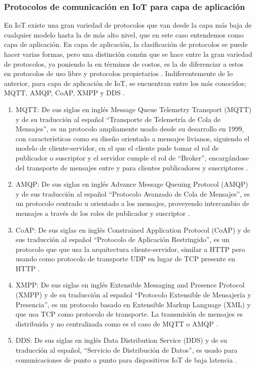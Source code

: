 \documentclass[stu,12pt,floatsintext]{apa7}
\begin{document}
	\subsubsection{Protocolos de comunicación en IoT para capa de aplicación}
	En IoT existe una gran variedad de protocolos que van desde la capa más baja de cualquier modelo hasta la de más alto nivel, que en este caso entendemos como capa de aplicación. En capa de aplicación, la clasificación de protocolos se puede hacer varias formas, pero una distinción común que se hace entre la gran variedad de protocolos, ya poniendo la en términos de costos, es la de diferenciar a estos en protocolos de uso libre y protocolos propietarios \cite{9090208}.
	Indiferentemente de lo anterior, para capa de aplicación de IoT, se encuentran entre los más conocidos; MQTT, AMQP, CoAP, XMPP y DDS \cite{YUGHA2020102763}.
	\begin{enumerate}[label=\alph*)]
	\item MQTT: De sus siglas en inglés Message Queue Telemetry Transport (MQTT) y de su traducción al español ``Transporte de Telemetría de Cola de Mensajes'', es un protocolo ampliamente usado desde su desarrollo en 1999, con características como su diseño orientado a mensajes livianos, siguiendo el modelo de cliente-servidor, en el que el cliente pude tomar el rol de publicador o suscriptor y el servidor cumple el rol de ``Broker'', encargándose del transporte de mensajes entre y para clientes publicadores y suscriptores \cite{EEI5236}.
	\item AMQP: De sus siglas en inglés Advance Message Queuing Protocol (AMQP) y de sus traducción al español ``Protocolo Avanzado de Cola de Mensajes'', es un protocolo centrado u orientado a los mensajes, proveyendo intercambio de mensajes a través de los roles de publicador y suscriptor \cite{YUGHA2020102763}.
	\item CoAP: De sus siglas en inglés Constrained Application Protocol (CoAP) y de sus traducción al español ``Protocolo de Aplicación Restringido'', es un protocolo que que usa la arquitectura cliente-servidor, similar a HTTP pero usando como protocolo de transporte UDP en lugar de TCP presente en HTTP \cite{9090208}.
	\item XMPP: De sus siglas en inglés Extensible Messaging and Presence Protocol (XMPP) y de su traducción al español ``Protocolo Extensible de Mensajería y Presencia'', es un protocolo basado en  Extensible Markup Language (XML) y que usa TCP como protocolo de transporte. La transmisión de mensajes es distribuida y no centralizada como es el caso de MQTT o AMQP \cite{YUGHA2020102763}.
	\item DDS: De sus siglas en inglés Data Distribution Service (DDS) y de su traducción al español, ``Servicio de Distribución de Datos'', es usado para comunicaciones de punto a punto para dispositivos IoT de baja latencia \cite{9090208}.
	\end{enumerate}
	
\end{document}
